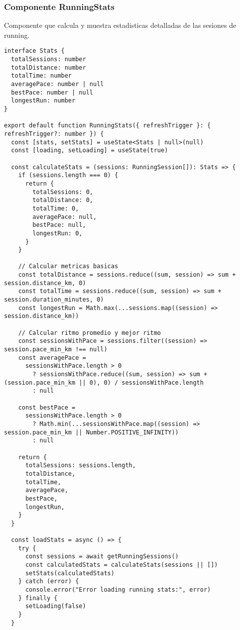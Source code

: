 \documentclass[12pt,a4paper]{article}
\begin{document}
\subsubsection{Componente RunningStats}

Componente que calcula y muestra estadisticas detalladas de las sesiones de running.

\begin{lstlisting}[caption=components/running/running-stats.tsx - Logica de calculo]
interface Stats {
  totalSessions: number
  totalDistance: number
  totalTime: number
  averagePace: number | null
  bestPace: number | null
  longestRun: number
}

export default function RunningStats({ refreshTrigger }: { refreshTrigger?: number }) {
  const [stats, setStats] = useState<Stats | null>(null)
  const [loading, setLoading] = useState(true)

  const calculateStats = (sessions: RunningSession[]): Stats => {
    if (sessions.length === 0) {
      return {
        totalSessions: 0,
        totalDistance: 0,
        totalTime: 0,
        averagePace: null,
        bestPace: null,
        longestRun: 0,
      }
    }

    // Calcular metricas basicas
    const totalDistance = sessions.reduce((sum, session) => sum + session.distance_km, 0)
    const totalTime = sessions.reduce((sum, session) => sum + session.duration_minutes, 0)
    const longestRun = Math.max(...sessions.map((session) => session.distance_km))

    // Calcular ritmo promedio y mejor ritmo
    const sessionsWithPace = sessions.filter((session) => session.pace_min_km !== null)
    const averagePace =
      sessionsWithPace.length > 0
        ? sessionsWithPace.reduce((sum, session) => sum + (session.pace_min_km || 0), 0) / sessionsWithPace.length
        : null

    const bestPace =
      sessionsWithPace.length > 0
        ? Math.min(...sessionsWithPace.map((session) => session.pace_min_km || Number.POSITIVE_INFINITY))
        : null

    return {
      totalSessions: sessions.length,
      totalDistance,
      totalTime,
      averagePace,
      bestPace,
      longestRun,
    }
  }

  const loadStats = async () => {
    try {
      const sessions = await getRunningSessions()
      const calculatedStats = calculateStats(sessions || [])
      setStats(calculatedStats)
    } catch (error) {
      console.error("Error loading running stats:", error)
    } finally {
      setLoading(false)
    }
  }


\end{lstlisting}
\end{document}
